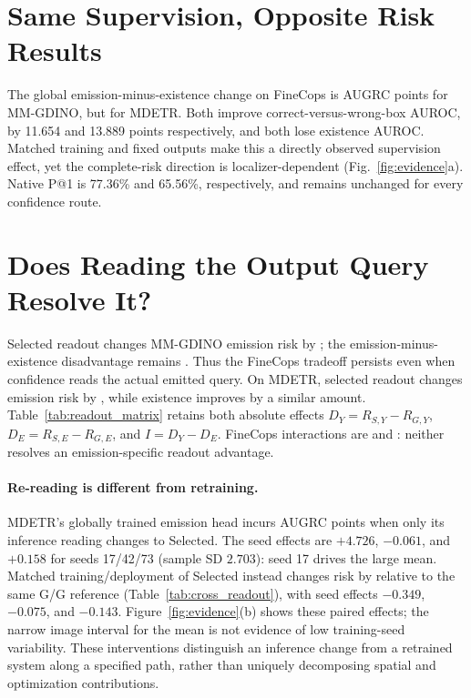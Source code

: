 \documentclass[10pt,twocolumn,letterpaper]{article}
\begin{document}
\section{Same Supervision, Opposite Risk Results}
The global emission-minus-existence change on FineCops is
\FCMMRisk{} AUGRC points for MM-GDINO, but \FCMDRisk{} for MDETR.
Both improve correct-versus-wrong-box AUROC, by 11.654 and 13.889
points respectively, and both lose existence AUROC. Matched training
and fixed outputs make this a directly observed supervision effect, yet the
complete-risk direction is localizer-dependent (Fig.~\ref{fig:evidence}a).
Native P@1 is 77.36\% and 65.56\%, respectively, and remains unchanged
for every confidence route.

\section{Does Reading the Output Query Resolve It?}

Selected readout changes MM-GDINO emission risk by \MMReadoutChange{};
the emission-minus-existence disadvantage remains
\MMSelectedTargetRisk{}. Thus the FineCops tradeoff persists even
when confidence reads the actual emitted query. On MDETR, selected
readout changes emission risk by \MDReadoutChange{}, while existence
improves by a similar amount. Table~\ref{tab:readout_matrix} retains both
absolute effects $D_Y=R_{S,Y}-R_{G,Y}$, $D_E=R_{S,E}-R_{G,E}$, and
$I=D_Y-D_E$. FineCops interactions are \MMInteraction{} and
\MDInteraction{}: neither resolves an emission-specific readout advantage.


\paragraph{Re-reading is different from retraining.}
MDETR's globally trained emission head incurs \MDInferenceChange{}
AUGRC points when only its inference reading changes to Selected.
The seed effects are $+4.726$, $-0.061$, and $+0.158$ for seeds
17/42/73 (sample SD $2.703$): seed 17 drives the large mean.
Matched training/deployment of Selected instead changes risk by
\MDReadoutChange{} relative to the same G/G reference
(Table~\ref{tab:cross_readout}), with seed effects $-0.349$, $-0.075$,
and $-0.143$. Figure~\ref{fig:evidence}(b) shows these paired effects;
the narrow image interval for the mean is not evidence of low training-seed
variability. These interventions distinguish an inference change from a
retrained system along a specified path, rather than uniquely decomposing
spatial and optimization contributions.
\end{document}
